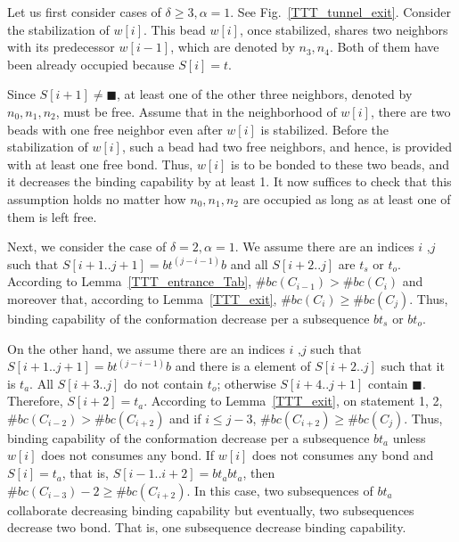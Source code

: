 


Let us first consider cases of $\delta \geq 3, \alpha = 1$. 
See Fig.~\ref{TTT_tunnel_exit}. Consider the stabilization of $w[i]$. 
This bead $w[i]$, once stabilized, shares two neighbors with its predecessor $w[i-1]$, which are denoted by $n_3, n_4$. 
Both of them have been already occupied because $S[i] = t$. 

Since $S[i+1] \neq \blacksquare$, at least one of the other three neighbors, denoted by $n_0, n_1, n_2$, must be free. 
Assume that in the neighborhood of $w[i]$, there are two beads with one free neighbor even after $w[i]$ is stabilized. 
Before the stabilization of $w[i]$, such a bead had two free neighbors, and hence, is provided with at least one free bond. 
Thus, $w[i]$ is to be bonded to these two beads, and it decreases the binding capability by at least 1. 
It now suffices to check that this assumption holds no matter how $n_0, n_1, n_2$ are occupied as long as at least one of them is left free. 

Next, we consider the case of $\delta = 2, \alpha = 1$. We assume there are an indices $i$ ,$j$ such that $S[i+1..j+1] = bt^{(j-i-1)}b$ and all $S[i+2..j]$ are  $ t_s$ or  $t_o$.
According to Lemma~\ref{TTT_entrance_Tab}, $\#bc(C_{i-1}) > \#bc(C_{i})$ and moreover that, according to Lemma~\ref{TTT_exit}, $\#bc(C_{i}) \geq \#bc(C_{j})$.
Thus, binding capability of the conformation decrease per a subsequence $bt_s$ or $bt_o$.

On the other hand, we assume there are an indices $i$ ,$j$ such that $S[i+1..j+1] = bt^{(j-i-1)}b$ and there is a element of $S[i+2..j]$ such that it is $t_a$.
All $S[i+3..j]$ do not contain $t_o$; otherwise $S[i+4..j+1]$ contain $\blacksquare$.
Therefore, $S[i+2] = t_a$.
According to Lemma~\ref{TTT_exit}, on statement 1, 2, $\#bc(C_{i-2}) > \#bc(C_{i+2})$ and if $i \leq j - 3$, $\#bc(C_{i+2}) \geq \#bc(C_{j})$.
Thus, binding capability of the conformation decrease per a subsequence $bt_a$ unless $w[i]$ does not consumes any bond.
If $w[i]$ does not consumes any bond and $S[i] = t_a$, that is, $S[i-1..i+2] = bt_abt_a$, then $\#bc(C_{i-3}) - 2 \geq \#bc(C_{i+2})$.
In this case, two subsequences of $bt_a$ collaborate decreasing binding capability but eventually, two subsequences decrease two bond.
That is, one subsequence decrease binding capability.



